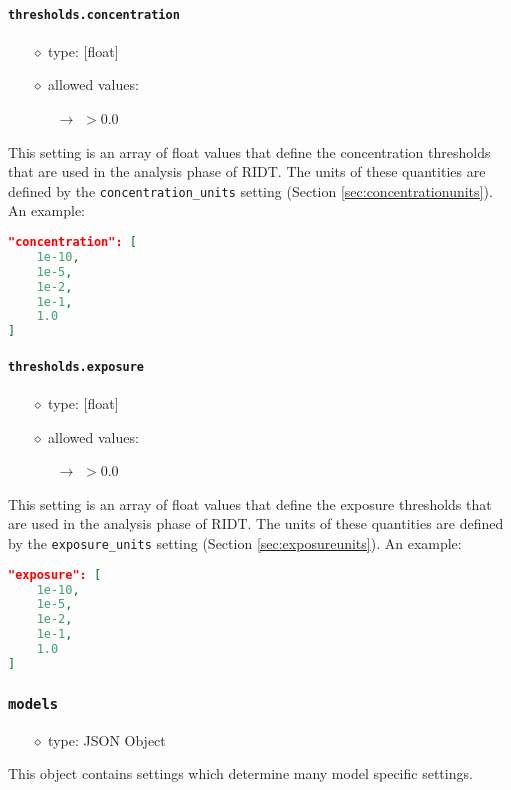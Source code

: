 \documentclass[]{article}
\def\code#1{\texttt{#1}}
\begin{document}
\paragraph{\code{thresholds.concentration}}\label{sec:concentrationthresholds}
\begin{itemize}
    \item[$\diamond$] type: [float] 
    \item[$\diamond$] allowed values:
    \begin{itemize}
        \item[$\rightarrow$] $>0.0$
    \end{itemize}
\end{itemize}
This setting is an array of float values that define the concentration
thresholds that are used in the analysis phase of RIDT. The units of these
quantities are defined by the \code{concentration\_units} setting (Section
\ref{sec:concentrationunits}). An example:\\
\begin{lstlisting}[language=json,firstnumber=1]
"concentration": [
    1e-10,
    1e-5,
    1e-2,
    1e-1,
    1.0
]
\end{lstlisting}

\paragraph{\code{thresholds.exposure}}\label{sec:exposurethresholds}
\begin{itemize}
    \item[$\diamond$] type: [float] 
    \item[$\diamond$] allowed values:
    \begin{itemize}
        \item[$\rightarrow$] $>0.0$
    \end{itemize}
\end{itemize}
This setting is an array of float values that define the exposure
thresholds that are used in the analysis phase of RIDT. The units of these
quantities are defined by the \code{exposure\_units} setting (Section
\ref{sec:exposureunits}). An example:\\
\begin{lstlisting}[language=json,firstnumber=1]
"exposure": [
    1e-10,
    1e-5,
    1e-2,
    1e-1,
    1.0
]
\end{lstlisting}

\subsubsection{\code{models}}
\begin{itemize}
    \item[$\diamond$] type: JSON Object 
\end{itemize}
This object contains settings which determine many model specific settings.
\end{document}

